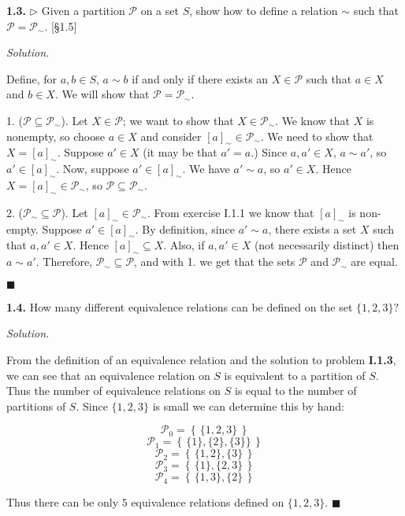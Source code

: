 \documentclass[14pt,parskip=full]{scrartcl}
\newcommand{\exercise}[3]{
\noindent
\textbf{#1.} #2

\noindent
\textit{Solution.}{\let\tpar\par \let\par\relax #3}
}
\newcommand{\set}[1]{\left\{\,#1\,\right\}}
\newcommand*{\QEDA}{\hfill\ensuremath{\blacksquare}}
\begin{document}
\exercise
{1.3}{$\rhd$ Given a partition $\mathscr{P}$ on a set $S$, show how to define a
relation $\sim$ such that $\mathscr{P} = \mathscr{P}_{\sim}$. [\S1.5]}{

Define, for $a,b\in S$, $a\sim b$ if and only if there exists an
$X\in\mathscr{P}$ such that $a\in X$ and $b\in X$. We will show that
$\mathscr{P} = \mathscr{P}_{\sim}$. 

\tpar
1. ($\mathscr{P}\subseteq\mathscr{P}_{\sim}$). Let $X\in \mathscr{P}$; we want to
show that $X\in\mathscr{P}_{\sim}$. We know that $X$ is
nonempty, so choose $a\in X$ and consider $[a]_{\sim}\in\mathscr{P}_{\sim}$. We
need to show that $X=[a]_{\sim}$. Suppose $a'\in X$ (it may be that $a'=a$.)
Since $a,a'\in X$, $a\sim a'$, so $a'\in[a]_{\sim}$. Now, suppose $a'\in
[a]_{\sim}$. We have $a'\sim a$, so $a'\in X$. Hence $X=[a]_{\sim}\in
\mathscr{P}_{\sim}$, so $\mathscr{P}\subseteq\mathscr{P}_{\sim}$.

\tpar
2. ($\mathscr{P}_{\sim}\subseteq\mathscr{P}$). Let $[a]_{\sim}\in\mathscr{P}_{\sim}$.
From exercise I.1.1 we know that $[a]_{\sim}$ is non-empty. Suppose
$a'\in[a]_{\sim}$. By definition, since $a'\sim a$, there exists a set $X$ such
that $a,a'\in X$. Hence $[a]_{\sim}\subseteq X$. Also, if $a,a'\in X$ (not
necessarily distinct) then $a\sim a'$. Therefore,
$\mathscr{P}_{\sim}\subseteq\mathscr{P}$, and with 1. we get that the sets
$\mathscr{P}$ and $\mathscr{P}_{\sim}$ are equal.

\QEDA

}

\exercise
{1.4}{How many different equivalence relations can be defined on the set
$\{1,2,3\}?$}{

From the definition of an equivalence relation and the solution to problem
\textbf{I.1.3}, we can see that an equivalence relation on $S$ is equivalent to
a partition of $S$. Thus the number of equivalence relations on $S$ is equal to
the number of partitions of $S$. Since $\{1,2,3\}$ is small we can determine
this by hand:

\tpar
\[ \mathscr{P}_0 = \set{\{1,2,3\}} \]
\[ \mathscr{P}_1 = \set{\{1\},\{2\},\{3\}\}} \]
\[ \mathscr{P}_2 = \set{\{1,2\},\{3\}} \]
\[ \mathscr{P}_3 = \set{\{1\},\{2,3\}} \]
\[ \mathscr{P}_4 = \set{\{1,3\},\{2\}} \]

\tpar
\noindent
Thus there can be only $5$ equivalence relations defined on $\{1,2,3\}$.
\QEDA

}
\end{document}
